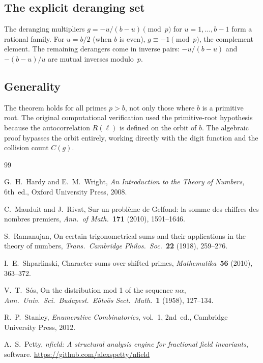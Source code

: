 \documentclass[12pt]{amsart}
\theoremstyle{definition}
\theoremstyle{remark}
\begin{document}
\subsection*{The explicit deranging set}

The deranging multipliers $g = -u/(b{-}u) \pmod{p}$ for
$u = 1, \ldots, b{-}1$ form a rational family. For $u = b/2$
(when $b$ is even), $g \equiv -1 \pmod{p}$, the complement
element. The remaining derangers come in inverse pairs:
$-u/(b{-}u)$ and $-(b{-}u)/u$ are mutual inverses modulo~$p$.

\subsection*{Generality}

The theorem holds for all primes $p > b$, not only those where
$b$ is a primitive root. The original computational verification
used the primitive-root hypothesis because the autocorrelation
$R(\ell)$ is defined on the orbit of $b$. The algebraic proof
bypasses the orbit entirely, working directly with the digit
function and the collision count $C(g)$.

\begin{thebibliography}{99}

G.~H.~Hardy and E.~M.~Wright,
\emph{An Introduction to the Theory of Numbers},
6th~ed., Oxford University Press, 2008.

C.~Mauduit and J.~Rivat,
Sur un probl\`eme de Gelfond: la somme des chiffres des
nombres premiers,
\emph{Ann.\ of Math.}\ \textbf{171} (2010), 1591--1646.

S.~Ramanujan,
On certain trigonometrical sums and their applications in the
theory of numbers,
\emph{Trans.\ Cambridge Philos.\ Soc.}\ \textbf{22} (1918),
259--276.

I.~E.~Shparlinski,
Character sums over shifted primes,
\emph{Mathematika}\ \textbf{56} (2010), 363--372.

V.~T.~S\'os,
On the distribution mod 1 of the sequence $n\alpha$,
\emph{Ann.\ Univ.\ Sci.\ Budapest.\ E\"otv\"os Sect.\ Math.}\
\textbf{1} (1958), 127--134.

R.~P.~Stanley,
\emph{Enumerative Combinatorics}, vol.~1,
2nd~ed., Cambridge University Press, 2012.

A.~S.~Petty,
\emph{nfield: A structural analysis engine for fractional field
invariants},
software.
\url{https://github.com/alexspetty/nfield}

\end{thebibliography}
\end{document}

